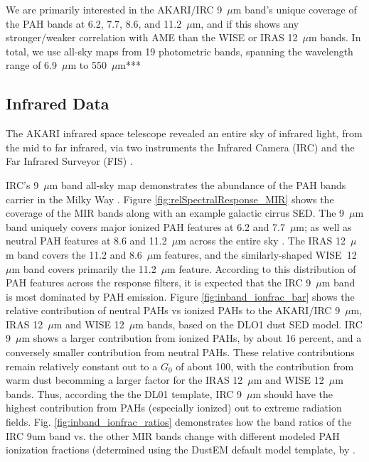 \documentclass[preprint2,longabstract]{aastex}
\begin{document}
We are primarily interested in the AKARI/IRC 9~$\mu$m band's unique coverage of the PAH bands at 6.2, 7.7, 8.6, and 11.2~$\mu$m, and if this shows any stronger/weaker correlation with AME than the WISE or IRAS 12~$\mu$m bands. In total, we use all-sky maps from 19 photometric bands, spanning the wavelength range of 6.9~$\mu$m to 550~$\mu$m***

\subsection{Infrared Data}

     The AKARI infrared space telescope revealed an entire sky of infrared light, from the mid to far infrared, via two instruments \citep{akari07} the Infrared Camera (IRC)\citep{irc07} and the Far Infrared Surveyor (FIS) \citep{fis07}.

     IRC's 9~$\mu$m band all-sky map demonstrates the abundance of the PAH bands carrier in the Milky Way \citep{ishihara10}. Figure \ref{fig:relSpectralResponse_MIR} shows the coverage of the MIR bands along with an example galactic cirrus SED. The 9~$\mu$m band uniquely covers major ionized PAH features at 6.2 and 7.7~$\mu$m; as well as neutral PAH features at 8.6 and 11.2~$\mu$m across the entire sky \citep{irc07}. The IRAS 12~$\mu$m band covers the 11.2 and 8.6~$\mu$m features, and the similarly-shaped WISE~12~$\mu$m band covers primarily the 11.2~$\mu$m feature. According to this distribution of PAH features across the response filters, it is expected that the IRC 9~$\mu$m band is most dominated by PAH emission. Figure \ref{fig:inband_ionfrac_bar} shows the relative contribution of neutral PAHs vs ionized PAHs to the AKARI/IRC 9~$\mu$m, IRAS 12~$\mu$m and WISE 12~$\mu$m bands, based on the DLO1 dust SED model. IRC 9~$\mu$m shows a larger contribution from ionized PAHs, by about 16 percent, and a conversely smaller contribution from neutral PAHs. These relative contributions remain relatively constant out to a $G_{0}$ of about 100, with the contribution from warm dust becomming a larger factor for the IRAS 12~$\mu$m and WISE 12~$\mu$m bands. Thus, according the the DL01 template, IRC 9~$\mu$m should have the highest contribution from PAHs (especially ionized) out to extreme radiation fields. Fig. \ref{fig:inband_ionfrac_ratios} demonstrates how the band ratios of the IRC 9um band vs. the other MIR bands change with different modeled PAH ionization fractions (determined using the DustEM default model template, by \cite{dustem11}.
\end{document}
